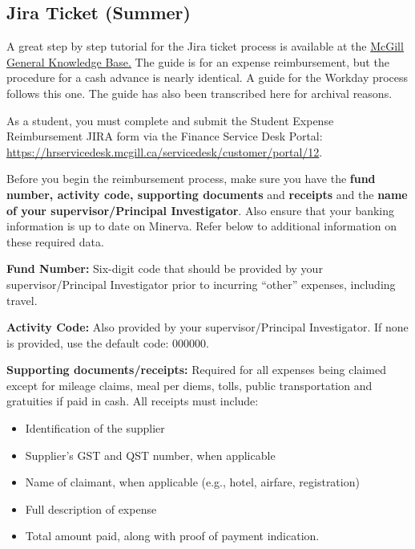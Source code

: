     
    \subsection{Jira Ticket (Summer)}  
    \noindent A great step by step tutorial for the Jira ticket process is available at the   \href{https://general-knowledgebase.mcgill.ca/spaces/FSKB/pages/133300374/Student+Grad+Undergrad+-+How+to+Submit+an+Expense+Report}{McGill General Knowledge Base.} The guide is for an expense reimbursement, but the procedure for a cash advance is nearly identical. A guide for the Workday process follows this one. The guide has also been transcribed here for archival reasons.
    
    \noindent As a student, you must complete and submit the Student Expense Reimbursement JIRA form via the Finance Service Desk Portal: \url{https://hrservicedesk.mcgill.ca/servicedesk/customer/portal/12}.
    
    \noindent Before you begin the reimbursement process, make sure you have the \textbf{fund number, activity code, supporting documents} and \textbf{receipts} and the \textbf{name of your supervisor/Principal Investigator}. Also ensure that your banking information is up to date on Minerva. Refer below to additional information on these required data.

     \noindent \textbf{Fund Number:} Six-digit code that should be provided by your supervisor/Principal Investigator prior to incurring “other” expenses, including travel.
     
     \noindent \textbf{Activity Code:} Also provided by your supervisor/Principal Investigator. If none is provided, use the default code: 000000.

    \noindent \textbf{Supporting documents/receipts:} Required for all expenses being claimed except for mileage claims, meal per diems, tolls, public transportation and gratuities if paid in cash. All receipts must include:
    \begin{itemize}
        \item Identification of the supplier
        \item Supplier’s GST and QST number, when applicable
        \item Name of claimant, when applicable (e.g., hotel, airfare, registration)
        \item Full description of expense
        \item Total amount paid, along with proof of payment indication.\\
    \end{itemize}
     
